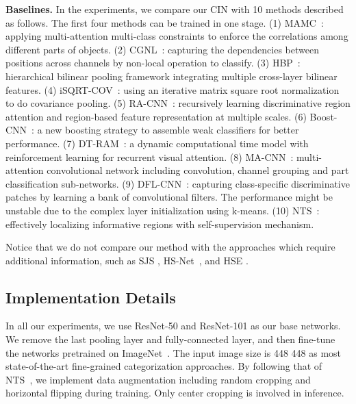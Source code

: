 \documentclass[letterpaper]{article} \usepackage{aaai20}  \usepackage{times}  \usepackage{helvet} \usepackage{courier}  \usepackage[hyphens]{url}  \usepackage{graphicx} \urlstyle{rm} \def\UrlFont{\rm}  \usepackage{graphicx}  \frenchspacing  \setlength{\pdfpagewidth}{8.5in}  \setlength{\pdfpageheight}{11in}  \usepackage{amsmath,amssymb}
\begin{document}
\noindent\textbf{Baselines.}
In the experiments, we compare our CIN with 10 methods described as follows.
The first four methods can be trained in one stage.
(1) MAMC~\cite{DBLP:conf/eccv/SunYZD18}: applying multi-attention multi-class constraints to enforce the correlations among different parts of objects.
(2) CGNL~\cite{yue2018compact}: capturing the dependencies between positions across channels by non-local operation to classify.
(3) HBP~\cite{yu2018hierarchical}: hierarchical bilinear pooling framework integrating multiple cross-layer bilinear features.
(4) iSQRT-COV~\cite{yu2018hierarchical}: using an iterative matrix square root normalization to do covariance pooling.
(5) RA-CNN~\cite{fu2017look}: recursively learning discriminative region attention and region-based feature representation at multiple scales.
(6) Boost-CNN~\cite{DBLP:conf/bmvc/MoghimiBSYVL16}: a new boosting strategy to assemble weak classifiers for better performance.
(7) DT-RAM~\cite{li2017dynamic}: a dynamic computational time model with reinforcement learning for recurrent visual attention.
(8) MA-CNN~\cite{zheng2017learning}: multi-attention convolutional network including convolution, channel grouping and part classification sub-networks.
(9) DFL-CNN~\cite{wang2018learning}: capturing class-specific discriminative patches by learning a bank of convolutional filters. The performance might be unstable due to the complex layer initialization using k-means.
(10) NTS~\cite{yang2018learning}: effectively localizing informative regions with self-supervision mechanism.

Notice that we do not compare our method  with the approaches which require additional information, such as SJS \cite{ge2017borrowing}, HS-Net~\cite{lam2017fine}, and  HSE \cite{chen2018fine}.


\subsection{Implementation Details}
In all our experiments, we use ResNet-50 and ResNet-101 as our base networks. We remove the last pooling layer and fully-connected layer, and then fine-tune the networks pretrained on ImageNet~\cite{DBLP:journals/ijcv/RussakovskyDSKS15}. The input image size is 448  448 as most state-of-the-art fine-grained categorization approaches. By following that of NTS~\cite{yang2018learning}, we implement data augmentation including random cropping
and horizontal flipping during training. Only center cropping is involved in inference.
\end{document}
